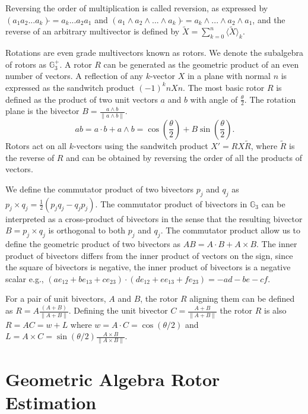 \documentclass{birkjour}
\numberwithin{equation}{section}
\begin{document}
Reversing the order of multiplication is called reversion, as expressed by $(a_1 a_2 ... a_k)\tilde{} = a_k ... a_2 a_1$ and $(a_1 \wedge a_2 \wedge ... \wedge a_k)\tilde{} = a_k \wedge ... \wedge a_2 \wedge a_1$, and the reverse of an arbitrary multivector is defined by $\tilde{X} = \sum_{k=0}^n { \langle \tilde{X} \rangle_k }$.

Rotations are even grade multivectors known as rotors. We denote the subalgebra of rotors as $\mathbb{G}^{+}_3$. A rotor $R$ can be generated as the geometric product of an even number of vectors. A reflection of any $k$-vector $X$ in a plane with normal $n$ is expressed as the sandwitch product $(-1)^k n X n$. The most basic rotor $R$ is defined as the product of two unit vectors $a$ and $b$ with angle of $\frac{\theta}{2}$. The rotation plane is the bivector $B = \frac{a \wedge b}{\| a \wedge b \|}$.
\begin{equation}
a b = a \cdot b + a \wedge b = \cos\left( \frac{\theta}{2} \right) + B \sin\left( \frac{\theta}{2} \right).
\end{equation}
Rotors act on all $k$-vectors using the sandwitch product $X' = R X \tilde R$, where $\tilde R$ is the reverse of $R$ and can be obtained by reversing the order of all the products of vectors.

We define the commutator product of two bivectors $p_j$ and $q_j$ as $p_j \times q_j = \frac{1}{2}(p_j q_j - q_j p _j)$. The commutator product of bivectors in $\mathbb{G}_3$  can be interpreted as a cross-product of bivectors in the sense that the resulting bivector $B = p_j \times q_j$ is orthogonal to both $p_j$ and $q_j$. The commutator product allow us to define the geometric product of two bivectors as $A B = A \cdot B + A \times B$. The inner product of bivectors differs from the inner product of vectors on the sign, since the square of bivectors is negative, the inner product of bivectors is a negative scalar e.g., $(a e_{12} + b e_{13} + c e_{23}) \cdot (d e_{12} + e e_{13} + f e_{23}) = -a d - b e - c f$.

For a pair of unit bivectors, $A$ and $B$, the rotor $R$ aligning them can be defined as $R = A \frac{(A + B)}{\|A + B\|}$. Defining the unit bivector $C = \frac{A + B}{\|A + B\|}$ the rotor $R$ is also $R = A C = w + L$ where $w = A \cdot C = \cos(\theta/2)$ and $L = A \times C = \sin(\theta/2) \frac{A \times B}{\|A \times B\|}$.

\section{Geometric Algebra Rotor Estimation}
\end{document}
